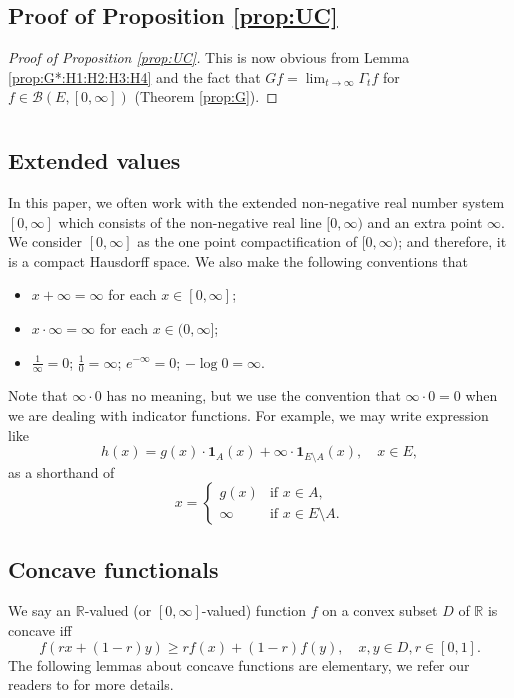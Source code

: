 \documentclass[12pt,a4paper]{amsart}
\numberwithin{equation}{section}
\theoremstyle{plain}
\theoremstyle{definition}
\theoremstyle{remark}
\begin{document}
\subsection{Proof of Proposition \ref{prop:UC}} \label{sec:UC}
\begin{proof}[Proof of Proposition \ref{prop:UC}]
	This is now obvious from Lemma \ref{prop:G*:H1:H2:H3:H4} and the fact that $Gf = \lim_{t\to \infty} \Gamma_t f$ for $f\in \mathcal B(E,[0,\infty])$ (Theorem \ref{prop:G}).
\end{proof}

\appendix\section{}
\subsection{Extended values} \label{sec:EV}
	In this paper, we often work with the extended non-negative real number system $[0,\infty]$ which consists of the non-negative real line $[0,\infty)$ and an extra point $\infty$.
	We consider $[0,\infty]$ as the one point compactification of $[0,\infty)$; and therefore, it is a compact Hausdorff space.
	We also make the following conventions that
\begin{itemize}
\item
	$x + \infty = \infty$ for each $x\in [0,\infty]$;
\item
	$x \cdot \infty = \infty$ for each $x\in (0,\infty]$;
\item
	$\frac{1}{\infty} = 0$; $\frac{1}{0} = \infty$; $e^{-\infty} =0$; $-\log 0 = \infty$.
\end{itemize}
	Note that $ \infty \cdot 0$ has no meaning, but we use the convention that $\infty \cdot 0 = 0$ when we are dealing with indicator functions.
	For example, we may write expression like
\begin{equation}
	h(x)
	= g(x) \cdot  \mathbf 1_{A} (x)+ \infty \cdot \mathbf 1_{E\setminus A}(x), \quad x\in E,
\end{equation}
	as a shorthand of
\begin{equation}
	x =
\begin{cases}
	g(x) & \text{if $x\in A$},
	\\ \infty & \text{if $x\in E\setminus A$}.
\end{cases}
\end{equation}

\subsection{Concave functionals}
	We say an $\mathbb R$-valued (or $[0,\infty]$-valued) function $f$ on a convex subset $D$ of $\mathbb R$ is concave iff
\[
   	f(rx+(1-r) y)
 	\geq r f(x) + (1-r) f(y),
 	\quad x,y \in D, r \in [0,1].
\]
	The following lemmas about concave functions are elementary, we refer our readers to \cite[Chapter 6]{Dudley2002Real} for more details.
\end{document}
